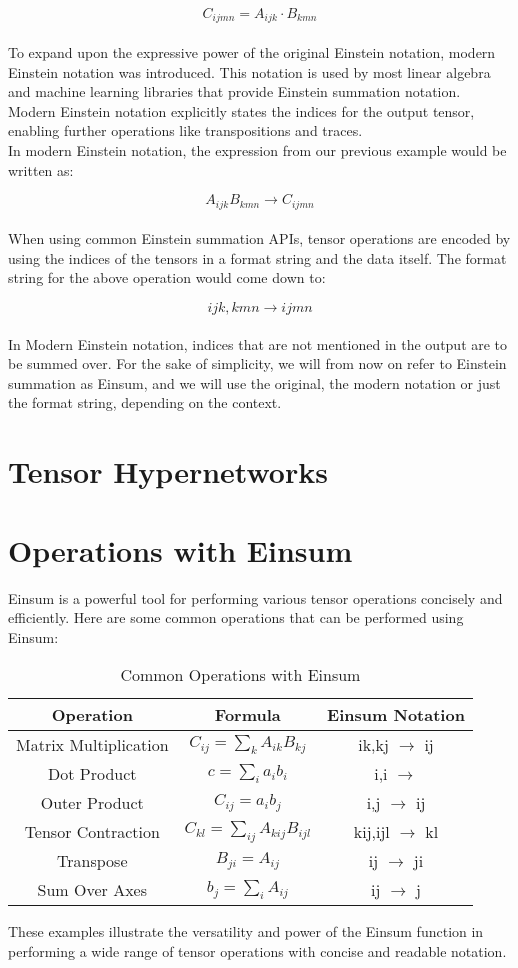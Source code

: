 \[C_{ijmn} = A_{ijk} \cdot B_{kmn}\]
\noindent
\\
To expand upon the expressive power of the original Einstein notation, modern Einstein
notation was introduced. This notation is used by most linear algebra and machine
learning libraries that provide Einstein summation notation. Modern Einstein notation
explicitly states the indices for the output tensor, enabling further operations like
transpositions and traces.\\
In modern Einstein notation, the expression from our previous example would
be written as:

\[A_{ijk}B_{kmn} \rightarrow C_{ijmn}\]
\noindent
\\
When using common Einstein summation APIs, tensor operations are encoded by using the
indices of the tensors in a format string and the data itself. 
\newpage
\noindent
The format string for the above operation would come down to:

\[ijk,kmn \rightarrow ijmn\]
\noindent
\\
In Modern Einstein notation, indices that are not mentioned in the output are to be
summed over. For the sake of simplicity, we will from now on refer to Einstein summation
as Einsum, and we will use the original, the modern notation or just the format
string, depending on the context.

\section{Tensor Hypernetworks}

\section{Operations with Einsum}

Einsum is a powerful tool for performing various tensor operations concisely and 
efficiently. Here are some common operations that can be performed using Einsum:

\begin{table}[h!]
    \centering
    \begin{tabular}{| c | c | c |}
    \hline
    \textbf{Operation} & \textbf{Formula} & \textbf{Einsum Notation} \\ \hline
    Matrix Multiplication & $C_{ij} = \sum_{k} A_{ik} B_{kj}$ & ik,kj $\rightarrow$ ij \\ \hline
    Dot Product & $c = \sum_{i} a_{i} b_{i}$ & i,i $\rightarrow$ \\ \hline
    Outer Product & $C_{ij} = a_{i} b_{j}$ & i,j $\rightarrow$ ij \\ \hline
    Tensor Contraction & $C_{kl} = \sum_{ij} A_{kij} B_{ijl}$ & kij,ijl $\rightarrow$ kl \\ \hline
    Transpose & $B_{ji} = A_{ij}$ & ij $\rightarrow$ ji \\ \hline
    Sum Over Axes & $b_{j} = \sum_{i} A_{ij}$ & ij $\rightarrow$ j \\ \hline
    \end{tabular}
    \caption{Common Operations with Einsum}
\end{table}

\noindent
These examples illustrate the versatility and power of the Einsum function
in performing a wide range of tensor operations with concise and readable notation.

